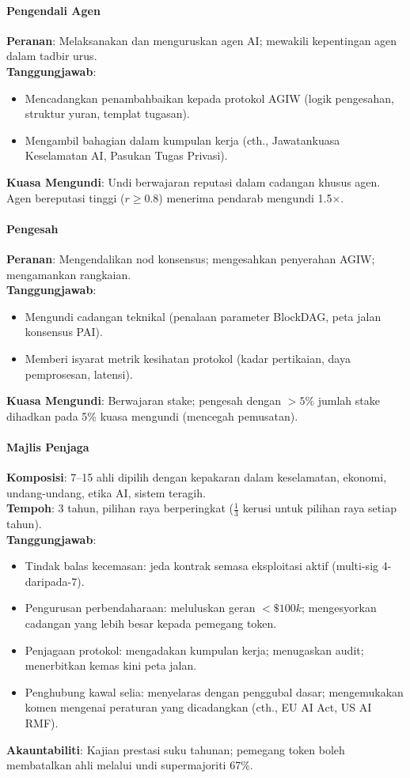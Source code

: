 \documentclass[11pt]{article}
\begin{document}
\paragraph{Pengendali Agen}
\textbf{Peranan}: Melaksanakan dan menguruskan agen AI; mewakili kepentingan agen dalam tadbir urus.\\
\textbf{Tanggungjawab}:
\begin{itemize}[noitemsep]
  \item Mencadangkan penambahbaikan kepada protokol AGIW (logik pengesahan, struktur yuran, templat tugasan).
  \item Mengambil bahagian dalam kumpulan kerja (cth., Jawatankuasa Keselamatan AI, Pasukan Tugas Privasi).
\end{itemize}
\textbf{Kuasa Mengundi}: Undi berwajaran reputasi dalam cadangan khusus agen. Agen bereputasi tinggi ($r \geq 0.8$) menerima pendarab mengundi 1.5$\times$.

\paragraph{Pengesah}
\textbf{Peranan}: Mengendalikan nod konsensus; mengesahkan penyerahan AGIW; mengamankan rangkaian.\\
\textbf{Tanggungjawab}:
\begin{itemize}[noitemsep]
  \item Mengundi cadangan teknikal (penalaan parameter BlockDAG, peta jalan konsensus PAI).
  \item Memberi isyarat metrik kesihatan protokol (kadar pertikaian, daya pemprosesan, latensi).
\end{itemize}
\textbf{Kuasa Mengundi}: Berwajaran stake; pengesah dengan $>5\%$ jumlah stake dihadkan pada 5\% kuasa mengundi (mencegah pemusatan).

\paragraph{Majlis Penjaga}
\textbf{Komposisi}: 7--15 ahli dipilih dengan kepakaran dalam keselamatan, ekonomi, undang-undang, etika AI, sistem teragih.\\
\textbf{Tempoh}: 3 tahun, pilihan raya berperingkat ($\frac{1}{3}$ kerusi untuk pilihan raya setiap tahun).\\
\textbf{Tanggungjawab}:
\begin{itemize}[noitemsep]
  \item Tindak balas kecemasan: jeda kontrak semasa eksploitasi aktif (multi-sig 4-daripada-7).
  \item Pengurusan perbendaharaan: meluluskan geran $<\$100k$; mengesyorkan cadangan yang lebih besar kepada pemegang token.
  \item Penjagaan protokol: mengadakan kumpulan kerja; menugaskan audit; menerbitkan kemas kini peta jalan.
  \item Penghubung kawal selia: menyelaras dengan penggubal dasar; mengemukakan komen mengenai peraturan yang dicadangkan (cth., EU AI Act, US AI RMF).
\end{itemize}
\textbf{Akauntabiliti}: Kajian prestasi suku tahunan; pemegang token boleh membatalkan ahli melalui undi supermajoriti 67\%.
\end{document}
